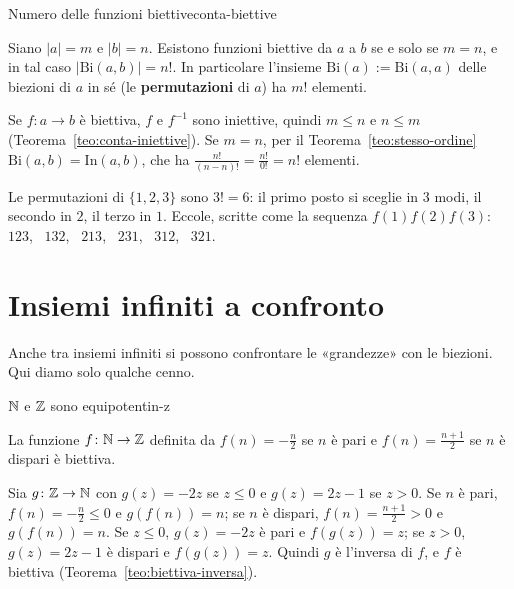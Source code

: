 \begin{concetto}
\begin{Corollario}{Numero delle funzioni biettive}{conta-biettive}
    \begin{prerequisiti}
    \end{prerequisiti}
    Siano $|a| = m$ e $|b| = n$. Esistono funzioni biettive da $a$ a $b$ se e solo se $m = n$, e in tal caso $|\mathrm{Bi}(a, b)| = n!$.
    In particolare l'insieme $\mathrm{Bi}(a) := \mathrm{Bi}(a, a)$ delle biezioni di $a$ in sé (le \textbf{permutazioni} di $a$) ha $m!$ elementi.
\end{Corollario}
\begin{dimostrazione}
    Se $f \colon a \to b$ è biettiva, $f$ e $f^{-1}$ sono iniettive, quindi $m \leq n$ e $n \leq m$ (Teorema~\ref{teo:conta-iniettive}). Se $m = n$,
    per il Teorema~\ref{teo:stesso-ordine} $\mathrm{Bi}(a, b) = \mathrm{In}(a, b)$, che ha $\frac{n!}{(n - n)!} = \frac{n!}{0!} = n!$ elementi.
\end{dimostrazione}
\end{concetto}

\begin{spiegazione}
    Le permutazioni di $\{1, 2, 3\}$ sono $3! = 6$: il primo posto si sceglie in $3$ modi, il secondo in $2$, il terzo in $1$. Eccole,
    scritte come la sequenza $f(1)f(2)f(3)$: \quad $123$, \ $132$, \ $213$, \ $231$, \ $312$, \ $321$.
\end{spiegazione}

\section{Insiemi infiniti a confronto}\label{sec:confronto-infiniti}

Anche tra insiemi infiniti si possono confrontare le «grandezze» con le biezioni. Qui diamo solo qualche cenno.

\begin{concetto}
\begin{Proposizione}{$\mathbb{N}$ e $\mathbb{Z}$ sono equipotenti}{n-z}
    \begin{prerequisiti}
    \end{prerequisiti}
    La funzione $f \colon \mathbb{N} \to \mathbb{Z}$ definita da $f(n) = -\frac{n}{2}$ se $n$ è pari e $f(n) = \frac{n + 1}{2}$ se $n$ è dispari è biettiva.
\end{Proposizione}
\begin{dimostrazione}
    Sia $g \colon \mathbb{Z} \to \mathbb{N}$ con $g(z) = -2z$ se $z \leq 0$ e $g(z) = 2z - 1$ se $z > 0$. Se $n$ è pari, $f(n) = -\frac{n}{2} \leq 0$ e
    $g(f(n)) = n$; se $n$ è dispari, $f(n) = \frac{n + 1}{2} > 0$ e $g(f(n)) = n$. Se $z \leq 0$, $g(z) = -2z$ è pari e $f(g(z)) = z$; se $z > 0$,
    $g(z) = 2z - 1$ è dispari e $f(g(z)) = z$. Quindi $g$ è l'inversa di $f$, e $f$ è biettiva (Teorema~\ref{teo:biettiva-inversa}).
\end{dimostrazione}
\end{concetto}

